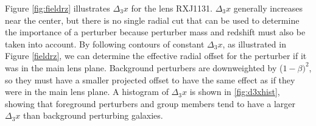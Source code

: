 Figure \ref{fig:fieldrz} illustrates $\Delta_3 x$ for the lens RXJ1131. $\Delta_3 x$ generally increases near the center, but there is no single radial cut that can be used to determine the importance of a perturber because perturber mass and redshift must also be taken into account. By following contours of constant $\Delta_3 x$, as illustrated in Figure \ref{fieldrz}, we can determine the effective radial offset for the perturber if it was in the main lens plane. Background perturbers are downweighted by ($1-\beta)^2$, so they must have a smaller projected offset to have the same effect as if they were in the main lens plane. A histogram of $\Delta_3 x$ is shown in \ref{fig:d3xhist}, showing that foreground perturbers and group members tend to have a larger $\Delta_3 x$ than background perturbing galaxies.
  
  
  